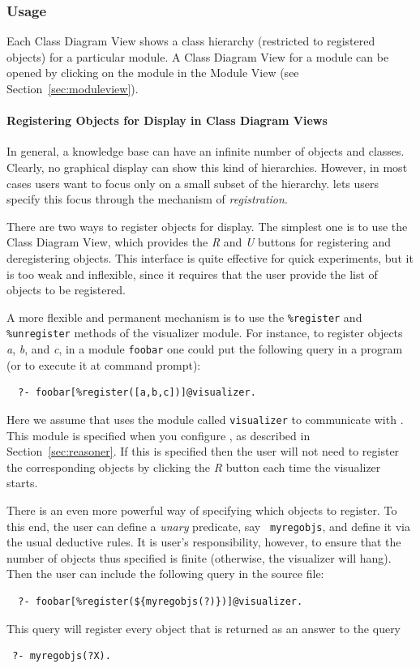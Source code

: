 \subsubsection{Usage}
\label{sec:visualizerview_usage}

Each \FVIZ Class Diagram View shows a class hierarchy (restricted to
registered objects) for
a particular \FLORA module. A \FVIZ Class Diagram View for a module
can be opened by
clicking on the module in the \FVIZ Module View (see
Section~\ref{sec:moduleview}).

\paragraph{Registering Objects for Display in Class Diagram Views}
\label{sec:visualizerview_usage_registration}

In general, a \FLORA knowledge base can have an infinite number of objects
and classes. Clearly, no graphical display can show this kind of hierarchies.
However, in most cases users want to focus only on a small subset of the
hierarchy.  \FVIZ lets users specify this focus through the mechanism of
\emph{registration}.

There are two ways to register objects for display. The simplest one is to
use the Class Diagram View, which provides the \emph{R} and \emph{U}
buttons for registering and deregistering objects. This interface is quite
effective for quick experiments, but it is too weak and inflexible, since
it requires that the user provide the list of objects to be registered.

A more flexible and permanent mechanism is to use the {\tt \%register} and
{\tt \%unregister} methods of the visualizer module.  For instance, to
register objects \emph{a}, \emph{b}, and \emph{c}, in a \FLORA
module {\tt foobar} one could put the following query in a \FLORA program
(or to execute it at command prompt):
\begin{verbatim}
  ?- foobar[%register([a,b,c])]@visualizer.
\end{verbatim}
Here we assume that \FVIZ uses the module called {\tt visualizer}
to communicate with \FLORA. This module is specified when you configure
\FVIZ, as described in Section~\ref{sec:reasoner}.
If this is specified then the user will not need to register the
corresponding objects by clicking the \emph{R} button each time the
visualizer starts.

There is an even more powerful way of specifying which objects to register.
To this end, the user can define a \emph{unary} predicate, say {\tt
  myregobjs}, and define it via the usual \FLORA deductive rules.  It is
user's responsibility, however, to ensure that the number of objects thus
specified is finite (otherwise, the visualizer will hang).
Then the user can include the following query in the source file:
\begin{verbatim}
  ?- foobar[%register(${myregobjs(?)})]@visualizer.
\end{verbatim}
This query will register every object that is returned as an answer to the query
\begin{verbatim}
 ?- myregobjs(?X).
\end{verbatim}

